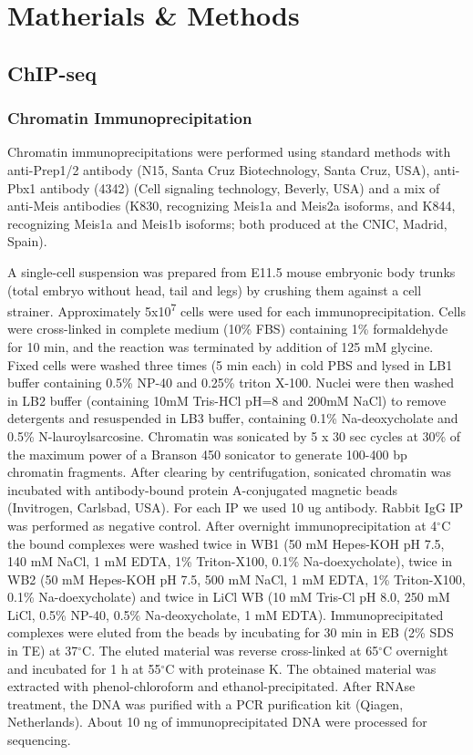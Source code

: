 \chapter{Matherials \& Methods}
\label{chp:methods}

\section{ChIP-seq}
\subsection{Chromatin Immunoprecipitation}

Chromatin immunoprecipitations were performed using standard methods with anti-Prep1/2 antibody (N15, Santa Cruz Biotechnology, Santa Cruz, USA), anti-Pbx1 antibody (4342) (Cell signaling technology, Beverly, USA) and a mix of anti-Meis antibodies (K830, recognizing Meis1a and Meis2a isoforms, and K844, recognizing Meis1a and Meis1b isoforms; both produced at the CNIC, Madrid, Spain).

A single-cell suspension was prepared from E11.5 mouse embryonic body trunks (total embryo without head, tail and legs) by crushing them against a cell strainer. Approximately 5x10\textsuperscript{7} cells were used for each immunoprecipitation. Cells were cross-linked in complete medium (10\% FBS) containing 1\% formaldehyde for 10 min, and the reaction was terminated by addition of 125 mM glycine. Fixed cells were washed three times (5 min each) in cold PBS and lysed in LB1 buffer containing 0.5\% NP-40 and 0.25\% triton X-100. Nuclei were then washed in LB2 buffer (containing 10mM Tris-HCl pH=8 and 200mM NaCl) to remove detergents and resuspended in LB3 buffer, containing 0.1\% Na-deoxycholate and 0.5\% N-lauroylsarcosine. Chromatin was sonicated by 5 x 30 sec cycles at 30\% of the maximum power of a Branson 450 sonicator to generate 100-400 bp chromatin fragments. After clearing by centrifugation, sonicated chromatin was incubated with antibody-bound protein A-conjugated magnetic beads (Invitrogen, Carlsbad, USA). For each IP we used 10 ug antibody. Rabbit IgG IP was performed as negative control. After overnight immunoprecipitation at 4$^\circ$C the bound complexes were washed twice in WB1 (50 mM Hepes-KOH pH 7.5, 140 mM NaCl, 1 mM EDTA, 1\% Triton-X100, 0.1\% Na-doexycholate), twice in WB2 (50 mM Hepes-KOH pH 7.5, 500 mM NaCl, 1 mM EDTA, 1\% Triton-X100, 0.1\% Na-doexycholate) and twice in LiCl WB (10 mM Tris-Cl pH 8.0, 250 mM LiCl, 0.5\% NP-40, 0.5\% Na-deoxycholate, 1 mM EDTA). Immunoprecipitated complexes were eluted from the beads by incubating for 30 min in EB (2\% SDS in TE) at 37$^\circ$C. The eluted material was reverse cross-linked at 65$^\circ$C overnight and incubated for 1 h at 55$^\circ$C with proteinase K. The obtained material was extracted with phenol-chloroform and ethanol-precipitated. After RNAse treatment, the DNA was purified with a PCR purification kit (Qiagen, Netherlands). About 10 ng of immunoprecipitated DNA were processed for sequencing.

